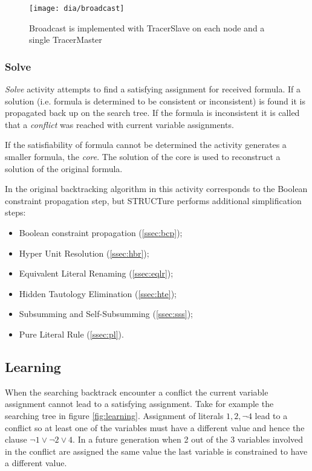 \begin{figure}[h]
  \centering
  \texttt{[image: dia/broadcast]}
  \caption{Broadcast is implemented with
  TracerSlave on each node and a single TracerMaster}
  \label{fig:broadcast}
\end{figure}


\subsubsection{Solve}
\label{sssec:solve}

\emph{Solve} activity attempts to find a satisfying assignment for
received formula. If a solution (i.e.  formula is determined to be
consistent or inconsistent) is found it is propagated back up on
the search tree. If the formula is inconsistent it is called that
a \emph{conflict} was reached with current variable assignments.

If the satisfiability of formula cannot be determined the activity
generates a smaller formula, the \emph{core}. The solution of the
core is used to reconstruct a solution of the original
formula.

In the original backtracking algorithm in
\cite{Davis:1960:CPQ:321033.321034} this activity corresponds to
the Boolean constraint propagation step, but STRUCTure performs
additional simplification steps:
\begin{itemize}
  \item Boolean constraint propagation (\ref{ssec:bcp});
  \item Hyper Unit Resolution (\ref{ssec:hbr});
  \item Equivalent Literal Renaming (\ref{ssec:eqlr});
  \item Hidden Tautology Elimination (\ref{ssec:hte});
  \item Subsumming and Self-Subsumming (\ref{ssec:sss});
  \item Pure Literal Rule (\ref{ssec:pl}).
\end{itemize}


\subsection{Learning}
\label{sssec:learning}

When the searching backtrack encounter a conflict the current
variable assignment cannot lead to a satisfying assignment.
Take for example the searching tree in figure \ref{fig:learning}.
Assignment of literals $1, 2, \neg 4$ lead to a conflict so at
least one of the variables must have a different value and hence the
clause $\neg 1 \lor \neg 2 \lor 4$.  In a future generation when 2
out of the 3 variables involved in the conflict are assigned the same
value the last variable is constrained to have a different value.

